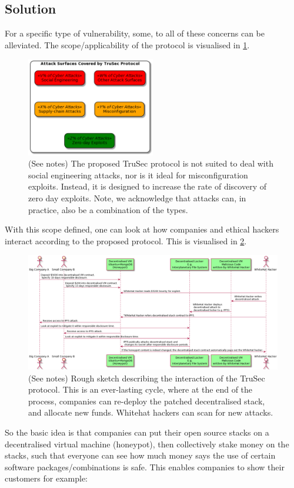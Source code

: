 \subsection{Solution}
For a specific type of vulnerability, some, to all of these concerns can be alleviated. The scope/applicability of the protocol is visualised in \cref{fig:protocol_scope}.
\begin{figure}[H]
    \centering
    \includegraphics[width=0.50\textwidth]{images/plantuml/scope.png}
    \caption{(See notes) The proposed TruSec protocol is not suited to deal with social engineering attacks, nor is it ideal for misconfiguration exploits. Instead, it is designed to increase the rate of discovery of zero day exploits. Note, we acknowledge that attacks can, in practice, also be a combination of the types.}
    \label{fig:protocol_scope}
\end{figure}

With this scope defined, one can look at how companies and ethical hackers interact according to the proposed protocol. This is visualised in \cref{fig:interaction}.

\begin{figure}[H]
    \centering
    \includegraphics[width=1.0\textwidth]{images/plantuml/interaction.png}
    \caption{(See notes) Rough sketch describing the interaction of the TruSec protocol. This is an ever-lasting cycle, where at the end of the process, companies can re-deploy the patched decentralised stack, and allocate new funds. Whitehat hackers can scan for new attacks.}
    \label{fig:interaction}
\end{figure}
\noindent So the basic idea is that companies can put their open source stacks on a decentralised virtual machine (honeypot), then collectively stake money on the stacks, such that everyone can see how much money says the use of certain software packages/combinations is safe. This enables companies to show their customers for example:

